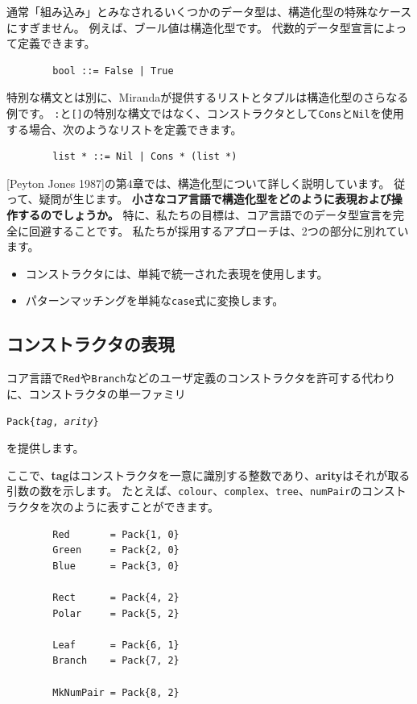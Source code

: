 \documentclass{jbook}
\begin{document}
通常「組み込み」とみなされるいくつかのデータ型は、構造化型の特殊なケースにすぎません。
例えば、ブール値は構造化型です。
代数的データ型宣言によって定義できます。

\begin{verbatim}
        bool ::= False | True
\end{verbatim}

特別な構文とは別に、Mirandaが提供するリストとタプルは構造化型のさらなる例です。
\texttt{:}と\texttt{[]}の特別な構文ではなく、コンストラクタとして\texttt{Cons}と\texttt{Nil}を使用する場合、次のようなリストを定義できます。

\begin{verbatim}
        list * ::= Nil | Cons * (list *)
\end{verbatim}

[Peyton Jones 1987]の第4章では、構造化型について詳しく説明しています。
従って、疑問が生じます。
\textbf{小さなコア言語で構造化型をどのように表現および操作するのでしょうか。}
特に、私たちの目標は、コア言語でのデータ型宣言を完全に回避することです。
私たちが採用するアプローチは、2つの部分に別れています。

\begin{itemize}
	\item コンストラクタには、単純で統一された表現を使用します。
	\item パターンマッチングを単純な\texttt{case}式に変換します。
\end{itemize}

\subsection{コンストラクタの表現} \label{sec_1_1_4}

コア言語で\texttt{Red}や\texttt{Branch}などのユーザ定義のコンストラクタを許可する代わりに、コンストラクタの単一ファミリ
\begin{center}
	\texttt{Pack\{\textit{tag}, \textit{arity}\}}
\end{center}
を提供します。

ここで、\textbf{tag}はコンストラクタを一意に識別する整数であり、\textbf{arity}はそれが取る引数の数を示します。
たとえば、\texttt{colour}、\texttt{complex}、\texttt{tree}、\texttt{numPair}のコンストラクタを次のように表すことができます。
\begin{verbatim}
        Red       = Pack{1, 0}
        Green     = Pack{2, 0}
        Blue      = Pack{3, 0}

        Rect      = Pack{4, 2}
        Polar     = Pack{5, 2}

        Leaf      = Pack{6, 1}
        Branch    = Pack{7, 2}

        MkNumPair = Pack{8, 2}
\end{verbatim}
\end{document}
